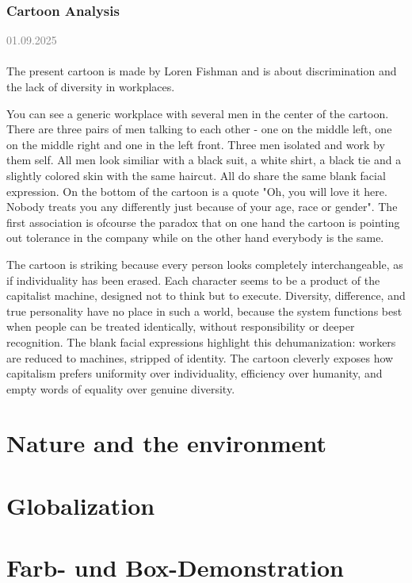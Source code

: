 \documentclass[11pt,a4paper,oneside]{article}
\newcommand{\lessondate}[1]{
	\noindent\hfill\textcolor{gray}{\textsc{#1}} \\
	\vspace{0.5cm}
}
\begin{document}
	\subsubsection{Cartoon Analysis}
	\lessondate{01.09.2025}\\
	The present cartoon is made by Loren Fishman and is about discrimination and the lack of diversity in workplaces. 
	
	You can see a generic workplace with several men in the center of the cartoon. There are three pairs of men talking to each other -  one on the middle left, one on the middle right and one in the left front. Three men isolated and work by them self. All men look similiar with a black suit, a white shirt, a black tie and a slightly colored skin with the same haircut. All do share the same blank facial expression. 
	On the bottom of the cartoon is a quote "Oh, you will love it here. Nobody treats you any differently just because of your age, race or gender". 
	The first association is ofcourse the paradox that on one hand the cartoon is pointing out tolerance in the company while on the other hand everybody is the same. 
	
	
	\vspace{20mm}
	The cartoon is striking because every person looks completely interchangeable, as if individuality has been erased. Each character seems to be a product of the capitalist machine, designed not to think but to execute. Diversity, difference, and true personality have no place in such a world, because the system functions best when people can be treated identically, without responsibility or deeper recognition. The blank facial expressions highlight this dehumanization: workers are reduced to machines, stripped of identity. The cartoon cleverly exposes how capitalism prefers uniformity over individuality, efficiency over humanity, and empty words of equality over genuine diversity.
	
	
	\section{Nature and the environment}
	\section{Globalization}
	
	
	\newpage
	
	
	\section{Farb- und Box-Demonstration}
\end{document}
